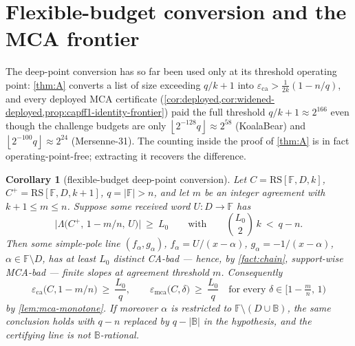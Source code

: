 \documentclass[11pt]{article}
\newtheorem{corollary}[corollary]{Corollary}
\theoremstyle{definition}
\theoremstyle{remark}
\newcommand{\F}{\mathbb{F}}
\newcommand{\B}{\mathbb{B}}
\newcommand{\RS}{\mathrm{RS}}
\newcommand{\eca}{\varepsilon_{\mathrm{ca}}}
\newcommand{\emca}{\varepsilon_{\mathrm{mca}}}
\newcommand{\Lst}{\Lambda}
\providecommand{\floor}[1]{\left\lfloor #1\right\rfloor}
\begin{document}
\section{Flexible-budget conversion and the MCA frontier}
\label{sec:capg-frontier}

The deep-point conversion has so far been used only at its threshold
operating point: \cref{thm:A} converts a list of size exceeding $q/k+1$
into $\eca>\tfrac1{2k}(1-n/q)$, and every deployed MCA certificate
(\cref{cor:deployed,cor:widened-deployed,prop:capff1-identity-frontier})
paid the full threshold $q/k+1\approx2^{166}$ even though the challenge
budgets are only $\floor{2^{-128}q}\approx2^{58}$ (KoalaBear) and
$\floor{2^{-100}q}\approx2^{24}$ (Mersenne-31).  The counting inside the
proof of \cref{thm:A} is in fact operating-point-free; extracting it
recovers the difference.

\begin{corollary}[flexible-budget deep-point conversion]
\label{cor:capg-budget-conversion}
Let $C=\RS[\F,D,k]$, $C^{+}=\RS[\F,D,k+1]$, $q=|\F|>n$, and let $m$ be an
integer agreement with $k+1\le m\le n$.  Suppose some received word
$U:D\to\F$ has
\[
        \bigl|\Lst\bigl(C^{+},\,1-m/n,\,U\bigr)\bigr|\ \ge\ L_0
        \qquad\text{with}\qquad
        \binom{L_0}{2}\,k\ <\ q-n .
\]
Then some simple-pole line $(f_\alpha,g_\alpha)$,
$f_\alpha=U/(x-\alpha)$, $g_\alpha=-1/(x-\alpha)$, $\alpha\in\F\setminus
D$, has at least $L_0$ distinct CA-bad --- hence, by \cref{fact:chain},
support-wise MCA-bad --- finite slopes at agreement threshold $m$.
Consequently
\[
        \eca\bigl(C,1-m/n\bigr)\ \ge\ \frac{L_0}{q},
        \qquad
        \emca\bigl(C,\delta\bigr)\ \ge\ \frac{L_0}{q}
        \quad\text{for every }\delta\in\bigl[1-\tfrac mn,\,1\bigr)
\]
by \cref{lem:mca-monotone}.  If moreover $\alpha$ is restricted to
$\F\setminus(D\cup\B)$, the same conclusion holds with $q-n$ replaced by
$q-|\B|$ in the hypothesis, and the certifying line is not $\B$-rational.
\end{corollary}
\end{document}
